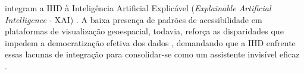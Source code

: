 \documentclass[
	12pt,				%
	oneside,			%
	a4paper,			%
	english,			%
	brazil				%
	]{abntex2ppgsi}
\begin{document}
     integram a IHD à Inteligência Artificial Explicável (\textit{Explainable Artificial Intelligence} - XAI) \cite{Yuan20243615, Turkay2021}. A baixa presença de padrões de acessibilidade em plataformas de visualização geoespacial, todavia, reforça as disparidades que impedem a democratização efetiva dos dados \cite{Capeleti2024Human}, demandando que a IHD enfrente essas lacunas de integração para consolidar-se como um assistente invisível eficaz \cite{Capeleti2024Human, Strey2019Human, Belizario2023Interacao}.

\end{document}
